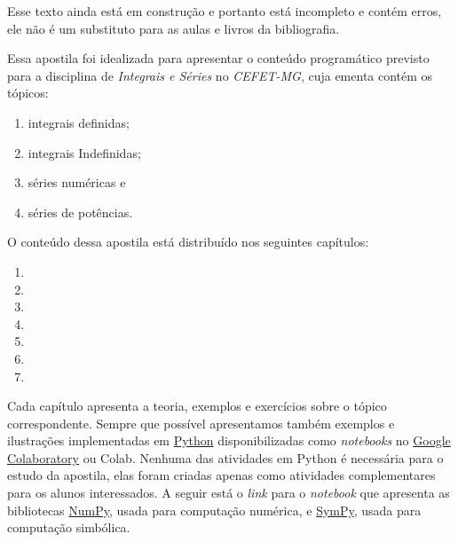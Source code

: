 \chapterPrefacio

\vspace{3cm}
\begin{observation}
  Esse texto ainda está em construção e portanto está incompleto e contém erros,
  ele não é um substituto para as aulas e livros da bibliografia.
\end{observation}
\vspace{3cm}

Essa apostila foi idealizada para apresentar o conteúdo programático previsto para
a disciplina de \emph{Integrais e Séries} no \emph{CEFET-MG},
cuja ementa contém os tópicos:
\vspace{-0.5\baselineskip}
\begin{enumerate}[nosep]
  \item integrais definidas;
  \item integrais Indefinidas;
  \item séries numéricas e
  \item séries de potências.
\end{enumerate}

O conteúdo dessa apostila está distribuído nos seguintes capítulos:
\vspace{-0.5\baselineskip}
\begin{enumerate}[nosep]
  \item {}
  \item {}
  \item {}
  \item {}
  \item {}
  \item {}
  \item {}
\end{enumerate}
Cada capítulo apresenta a teoria, exemplos e exercícios sobre o tópico correspondente.
Sempre que possível apresentamos também exemplos e ilustrações implementadas em
\href{https://www.python.org}{Python} disponibilizadas como
\textit{notebooks} no
\href{https://colab.research.google.com}{Google Colaboratory} ou Colab.
Nenhuma das atividades em Python é necessária para o estudo da apostila,
elas foram criadas apenas como atividades complementares para os alunos interessados.
A seguir está o \textit{link} para o \textit{notebook} que apresenta as bibliotecas
\href{https://numpy.org}{NumPy}, usada para computação numérica, e
\href{https://www.sympy.org}{SymPy}, usada para computação simbólica.

